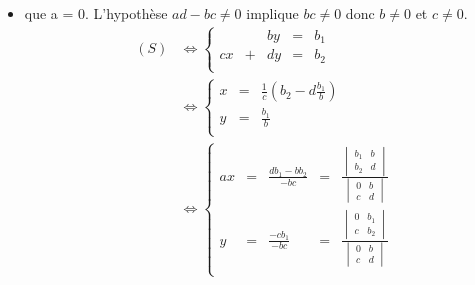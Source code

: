 \documentclass{article}
\renewenvironment{question_kholle}[2][ ]
{
	\subsection{\texorpdfstring{#2}{}}
	\notblank{#1}
	{
		\noindent #1
		\bigbreak
	}
	{}
	\begin{proof}
}
{
	\end{proof}
}
\begin{document}
\begin{question_kholle}
\begin{itemize}[label=$\bullet$ Supposons]
\begin{itemize}[label=$\bullet$ Supposons]
\begin{equation*}
\begin{aligned}
\begin{array}{ccccc}
						            y  & = & \frac{ab_2 - cb_1}{ad - bc} & = & \frac{\begin{vmatrix}a&b_1\\c&b_2\end{vmatrix}}{\begin{vmatrix}a&b\\c&d\end{vmatrix}} \\
					            \end{array}
					            \right.
				            \end{aligned}
			            \end{equation*}
			            Donc le système admet une unique solution qui est celle annoncée.

			      \item que a = 0. L'hypothèse $ad - bc \neq 0$ implique $bc \neq 0$ donc $b \neq 0$ et $c \neq 0$.
			            \begin{equation*}
				            \begin{aligned}
					            (S)
					             & \iff \left\{
					            \begin{array}{ccccc}
						               &   & by & = & b_1 \\
						            cx & + & dy & = & b_2 \\
					            \end{array}
					            \right.         \\
					             & \iff \left\{
					            \begin{array}{ccc}
						            x & = & \frac{1}{c} \left( b_2 - d\frac{b_1}{b} \right) \\
						            y & = & \frac{b_1}{b}                                   \\
					            \end{array}
					            \right.         \\
					             & \iff \left\{
					            \begin{array}{ccccc}
						            ax & = & \frac{db_1 - bb_2}{- bc} & = & \frac{\begin{vmatrix}b_1&b\\b_2&d\end{vmatrix}}{\begin{vmatrix}0&b\\c&d\end{vmatrix}} \\
						            y  & = & \frac{- cb_1}{- bc}      & = & \frac{\begin{vmatrix}0&b_1\\c&b_2\end{vmatrix}}{\begin{vmatrix}0&b\\c&d\end{vmatrix}} \\

\end{array}
\end{aligned}
\end{equation*}
\end{itemize}
\end{itemize}
\end{question_kholle}
\end{document}
